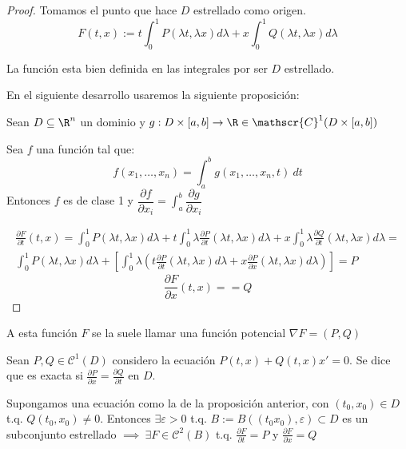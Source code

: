 \begin{proof}
Tomamos el punto que hace $D$ estrellado como origen.
\[
F(t,x) := t \int _0 ^1 P(\lambda t, \lambda x) d\lambda + x \int _0 ^1 Q(\lambda t, \lambda x ) d\lambda
\]

La función esta bien definida en las integrales por ser $D$ estrellado.

En el siguiente desarrollo usaremos la siguiente proposición:

\begin{nprop}
  Sean $D \subseteq \R^n$ un dominio y $g: D\times [a,b] \to \R \in \mathscr{C}^1(D\times [a,b])$

Sea $f$ una función tal que: 
\[
f(x_1,\dots,x_n) = \int _a ^b g(x_1,\dots,x_n,t) \ dt
\]
Entonces $f$ es de clase 1 y $\dfrac{\partial f}{\partial x_i} = \displaystyle\int _a ^b \dfrac{\partial g}{\partial x_i}$


\end{nprop}

\[
\begin{array}{l}
  \frac{\partial F}{\partial t} (t,x) = \int _0 ^1 P(\lambda t, \lambda x) d\lambda + t \int _0 ^1 \lambda \frac{\partial P}{\partial t}(\lambda t, \lambda x) d\lambda + x\int _0 ^1 \lambda \frac{\partial Q}{\partial t}(\lambda t, \lambda x) d\lambda =\\
  \int_0^1 P(\lambda t, \lambda x)d\lambda + \left[\int_0^1 \lambda\left( t\frac{\partial P}{\partial t}(\lambda t, \lambda x)d\lambda + x\frac{\partial P}{\partial x}(\lambda t, \lambda x)d\lambda \right) \right] = P
\end{array}
\]
\[
\frac{\partial F}{\partial x} (t,x) =  = Q
\]

\end{proof}

A esta función $F$ se la suele llamar una función potencial $\nabla F = (P,Q)$

\begin{ndef}
Sean $P,Q \in \mathscr{C}^1 (D)$ considero la ecuación $P(t,x) + Q(t,x) x' = 0$. Se dice que es exacta si $\frac{\partial P}{\partial x} = \frac{\partial Q}{\partial t}$ en $D$.
\end{ndef}

Supongamos una ecuación como la de la proposición anterior, con $(t_0, x_0) \in D$ t.q. $Q(t_0, x_0) \neq 0$. Entonces $\exists \varepsilon > 0$ t.q. $B  := B( (t_0 x_0 ), \varepsilon) \subset D$ es un subconjunto estrellado $\implies \ \exists F \in \mathscr{C}^2 (B)$ t.q. $\frac{\partial F}{\partial t} = P$ y $\frac{\partial F}{\partial x} = Q$

